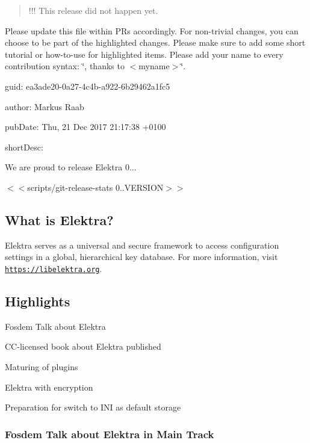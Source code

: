 \begin{quote}
!!! This release did not happen yet. \end{quote}


Please update this file within P\+Rs accordingly. For non-\/trivial changes, you can choose to be part of the highlighted changes. Please make sure to add some short tutorial or how-\/to-\/use for highlighted items. Please add your name to every contribution syntax\+: \char`\"{}, thanks to $<$myname$>$\char`\"{}.


\begin{DoxyItemize}
\item guid\+: ea3ade20-\/0a27-\/4c4b-\/a922-\/6b29462a1fc5
\item author\+: Markus Raab
\item pub\+Date\+: Thu, 21 Dec 2017 21\+:17\+:38 +0100
\item short\+Desc\+:
\end{DoxyItemize}

We are proud to release Elektra 0...

$<$$<${\ttfamily scripts/git-\/release-\/stats 0..\+V\+E\+R\+S\+I\+ON}$>$$>$

\subsection*{What is Elektra?}

Elektra serves as a universal and secure framework to access configuration settings in a global, hierarchical key database. For more information, visit \href{https://libelektra.org}{\tt https\+://libelektra.\+org}.

\subsection*{Highlights}


\begin{DoxyItemize}
\item Fosdem Talk about Elektra
\item C\+C-\/licensed book about Elektra published
\item Maturing of plugins
\item Elektra with encryption
\item Preparation for switch to I\+NI as default storage
\end{DoxyItemize}

\subsubsection*{Fosdem Talk about Elektra in Main Track}

